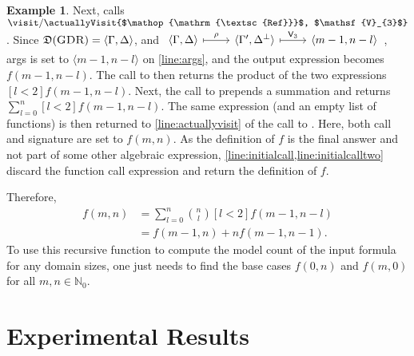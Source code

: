 \documentclass{article}
\theoremstyle{definition}
\newtheorem{example}{Example}
\newcommand{\Vone}{\mathsf{V}_{1}}
\newcommand{\Vthree}{\mathsf{V}_{3}}
\DeclareMathOperator{\GDR}{\textsc{GDR}}
\DeclareMathOperator{\Reff}{\textsc{Ref}}
\begin{document}
\begin{example}
  Next, \actuallyVisit{$\land$, $\Vthree$} calls
  $\visit/\actuallyVisit{$\Reff$, $\Vthree$}$. Since
  $\mathfrak{D}(\GDR) = \langle \Gamma, \Delta \rangle$, and
  $\begin{tikzcd} \langle\Gamma, \Delta\rangle \ar[r, mapsto, "\rho"] & \langle\Gamma', \Delta^{\bot}\rangle \ar[r, mapsto, "\Vthree"] & \langle m-1, n-l \rangle\end{tikzcd}$,
  \textsf{args} is set to $\langle m-1, n-l \rangle$ on \cref{line:args}, and
  the output expression becomes $f(m-1, n-l)$. The call to
  \actuallyVisit{$\land$, $\Vthree$} then returns the product of the two
  expressions $[l<2]f(m-1, n-l)$. Next, the call to \actuallyVisit{$\bigvee$,
    $\Vone$} prepends a summation and returns $\sum_{l=0}^{n}[l<2]f(m-1,n-l)$.
  The same expression (and an empty list of functions) is then returned to
  \cref{line:actuallyvisit} of the call to \visit{$\GDR$, $\Vone$}. Here, both
  \textsf{call} and \textsf{signature} are set to $f(m, n)$. As the definition
  of $f$ is the final answer and not part of some other algebraic expression,
  \cref{line:initialcall,line:initialcalltwo} discard the function call
  expression and return the definition of $f$.

  Therefore,
  \begin{align}
    f(m, n) &= \sum_{l = 0}^{n} \binom{n}{l} [l < 2] f(m-1, n-l)\nonumber \\
            &= f(m-1, n) + n f(m-1, n-1).\label{eq:solution}
  \end{align}
  To use this recursive function to compute the model count of the input formula
  for any domain sizes, one just needs to find the base cases $f(0, n)$ and
  $f(m, 0)$ for all $m, n \in \mathbb{N}_{0}$.
\end{example}

\section{Experimental Results}\label{sec:results}
\end{document}
